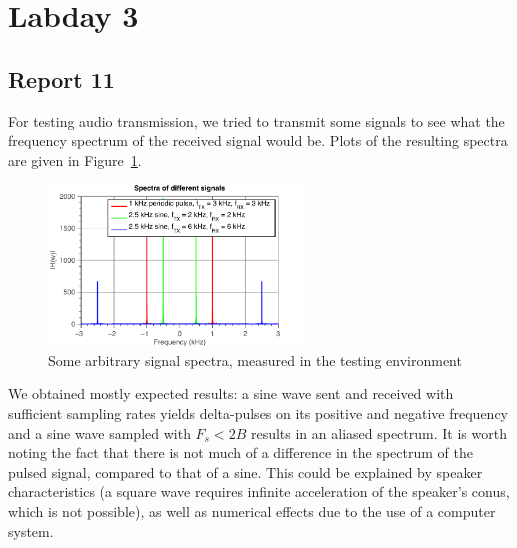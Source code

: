 \documentclass[11pt,titlepage]{report}
\begin{document}
\section{Labday 3}
\subsection{Report 11}
For testing audio transmission, we tried to transmit some signals to see what the frequency spectrum of the received signal would be. Plots of the resulting spectra are given in Figure~\ref{fig:rep11-test-spectra}.

\begin{figure}[H]
	\centering
	\includegraphics[width=0.6\textwidth]{../../deliverable-7-resources/figures/ass-1/report-11-12-13/ass-1-report-11-random-signals.pdf}
	\caption{Some arbitrary signal spectra, measured in the testing environment}
	\label{fig:rep11-test-spectra}
\end{figure}

We obtained mostly expected results: a sine wave sent and received with sufficient sampling rates yields delta-pulses on its positive and negative frequency and a sine wave sampled with $F_s < 2B$ results in an aliased spectrum. It is worth noting the fact that there is not much of a difference in the spectrum of the pulsed signal, compared to that of a sine. This could be explained by speaker characteristics (a square wave requires infinite acceleration of the speaker's conus, which is not possible), as well as numerical effects due to the use of a computer system.
\end{document}
